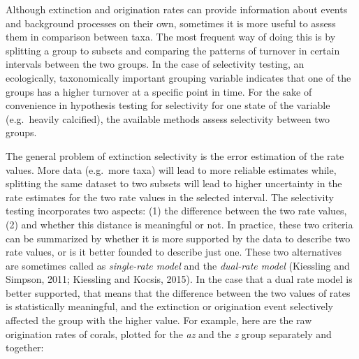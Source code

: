 \documentclass[]{article}
\begin{document}
Although extinction and origination rates can provide information about
events and background processes on their own, sometimes it is more
useful to assess them in comparison between taxa. The most frequent way
of doing this is by splitting a group to subsets and comparing the
patterns of turnover in certain intervals between the two groups. In the
case of selectivity testing, an ecologically, taxonomically important
grouping variable indicates that one of the groups has a higher turnover
at a specific point in time. For the sake of convenience in hypothesis
testing for selectivity for one state of the variable (e.g.~heavily
calcified), the available methods assess selectivity between two groups.

The general problem of extinction selectivity is the error estimation of
the rate values. More data (e.g.~more taxa) will lead to more reliable
estimates while, splitting the same dataset to two subsets will lead to
higher uncertainty in the rate estimates for the two rate values in the
selected interval. The selectivity testing incorporates two aspects: (1)
the difference between the two rate values, (2) and whether this
distance is meaningful or not. In practice, these two criteria can be
summarized by whether it is more supported by the data to describe two
rate values, or is it better founded to describe just one. These two
alternatives are sometimes called as \emph{single-rate model} and the
\emph{dual-rate model} (Kiessling and Simpson, 2011; Kiessling and
Kocsis, 2015). In the case that a dual rate model is better supported,
that means that the difference between the two values of rates is
statistically meaningful, and the extinction or origination event
selectively affected the group with the higher value. For example, here
are the raw origination rates of corals, plotted for the \emph{az} and
the \emph{z} group separately and together:
\end{document}
